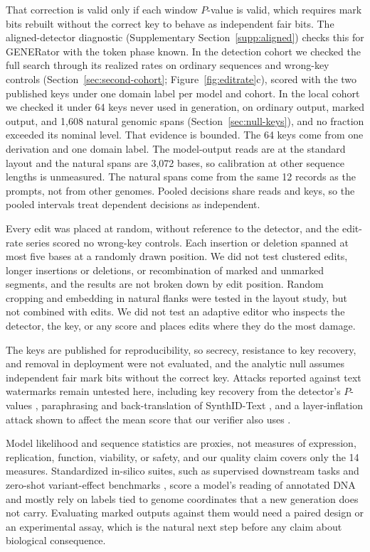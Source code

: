 \documentclass[10pt,twocolumn]{article}
\begin{document}
That correction is valid only if each window $P$-value is valid, which requires mark bits rebuilt
without the correct key to behave as independent fair bits. The aligned-detector diagnostic
(Supplementary Section~\ref{supp:aligned}) checks this for GENERator with the token phase known. In
the detection cohort we checked the full search through its realized rates on ordinary sequences and
wrong-key controls (Section~\ref{sec:second-cohort}; Figure~\ref{fig:editrate}c), scored with the two
published keys under one domain label per model and cohort. In the local cohort we checked it under 64
keys never used in generation, on ordinary output, marked output, and 1{,}608 natural genomic spans
(Section~\ref{sec:null-keys}), and no fraction exceeded its nominal level. That evidence is bounded.
The 64 keys come from one derivation and one domain label. The model-output reads are at the
standard layout and the natural spans are 3{,}072 bases, so calibration at other sequence lengths
is unmeasured. The natural spans come from the same 12 records as the prompts, not from other
genomes. Pooled decisions share reads and keys, so the pooled intervals treat dependent decisions as
independent.

Every edit was placed at random, without reference to the detector, and the edit-rate series scored
no wrong-key controls. Each insertion or deletion spanned at most five bases at a randomly drawn
position. We did not test clustered edits, longer insertions or deletions, or recombination of marked and
unmarked segments, and the results are not broken down by edit position. Random cropping and
embedding in natural flanks were tested in the layout study, but not combined with edits. We did
not test an adaptive editor who inspects the detector, the key, or
any score and places edits where they do the most damage.

The keys are published for reproducibility, so secrecy, resistance to key recovery, and removal in
deployment were not evaluated, and the analytic null assumes independent fair mark bits without
the correct key. Attacks reported against text watermarks remain untested here, including key
recovery from the detector's $P$-values \cite{reynolds2025breaking}, paraphrasing and
back-translation of SynthID-Text \cite{han2025synthid}, and a layer-inflation attack shown to
affect the mean score that our verifier also uses \cite{omidi2026synthid}.

Model likelihood and sequence statistics are proxies, not measures of expression, replication,
function, viability, or safety, and our quality claim covers only the 14 measures. Standardized
in-silico suites, such as supervised downstream tasks and zero-shot variant-effect benchmarks
\cite{marin2024bend,liu2024genbench,patel2024darteval}, score a model's reading of annotated DNA
and mostly rely on labels tied to genome coordinates that a new generation does not carry.
Evaluating marked outputs against them would need a paired design or an experimental assay, which
is the natural next step before any claim about biological consequence.
\end{document}
